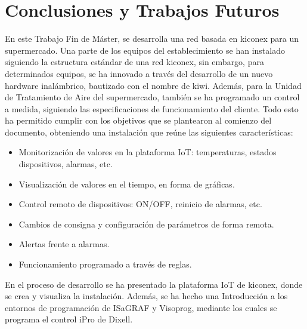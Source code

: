 
\cleardoublepage
\chapter{Conclusiones y Trabajos Futuros}

\label{chap:conclusiones} %

En este Trabajo Fin de Máster, se desarrolla una red basada en kiconex para un supermercado. Una parte de los equipos del establecimiento se han instalado siguiendo la estructura estándar de una red kiconex, sin embargo, para determinados equipos, se ha innovado a través del desarrollo de un nuevo hardware inalámbrico, bautizado con el nombre de kiwi. Además, para la Unidad de Tratamiento de Aire del supermercado, también se ha programado un control a medida, siguiendo las especificaciones de funcionamiento del cliente. Todo esto ha permitido cumplir con los objetivos que se plantearon al comienzo del documento, obteniendo una instalación que reúne las siguientes características:

\begin{itemize}
    \item Monitorización de valores en la plataforma IoT: temperaturas, estados dispositivos, alarmas, etc.
    \item Visualización de valores en el tiempo, en forma de gráficas.
    \item Control remoto de dispositivos: ON/OFF, reinicio de alarmas, etc.
    \item Cambios de consigna y configuración de parámetros de forma remota.
    \item Alertas frente a alarmas.
    \item Funcionamiento programado a través de reglas.
\end{itemize}

En el proceso de desarrollo se ha presentado la plataforma IoT de kiconex, donde se crea y visualiza la instalación. Además, se ha hecho una Introducción a los entornos de programación de ISaGRAF y Visoprog, mediante los cuales se programa el control iPro de Dixell.

